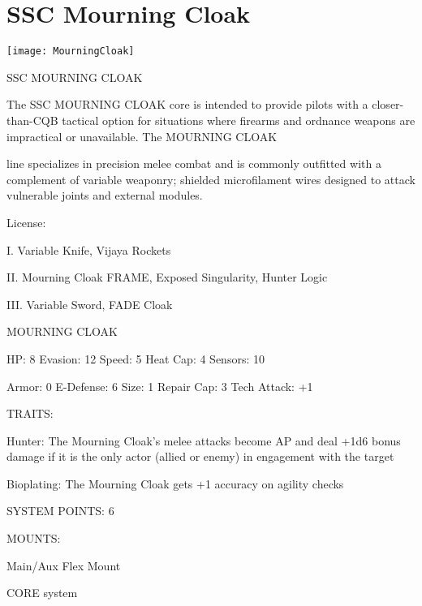 \section{SSC Mourning Cloak}

\begin{center}
    \texttt{[image: MourningCloak]}
\end{center}


                                    SSC MOURNING CLOAK

The SSC MOURNING CLOAK core is intended to provide pilots with a closer-than-CQB tactical option for
situations where firearms and ordnance weapons are impractical or unavailable. The MOURNING CLOAK

line specializes in precision melee combat and is commonly outfitted with a complement of variable
weaponry; shielded microfilament wires designed to attack vulnerable joints and external modules.


                                                  License:

I. Variable Knife, Vijaya Rockets

II. Mourning Cloak FRAME, Exposed Singularity, Hunter Logic

III. Variable Sword, FADE Cloak


                                           MOURNING CLOAK

  HP: 8          Evasion: 12                          Speed: 5           Heat Cap: 4        Sensors: 10

  Armor: 0       E-Defense: 6                         Size: 1            Repair Cap: 3      Tech Attack:
                                                                                            +1

                                                   TRAITS:

  Hunter: The Mourning Cloak’s melee attacks become AP and deal +1d6 bonus damage if it is the only
  actor (allied or enemy) in engagement with the target

  Bioplating: The Mourning Cloak gets +1 accuracy on agility checks

                                             SYSTEM POINTS: 6

                                                  MOUNTS:

  Main/Aux                                             Flex Mount

                                                CORE system




